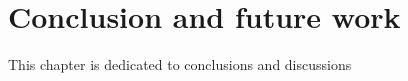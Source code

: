 \chapter{Conclusion and future work}
\label{chap:conclusion}

This chapter is dedicated to conclusions and discussions